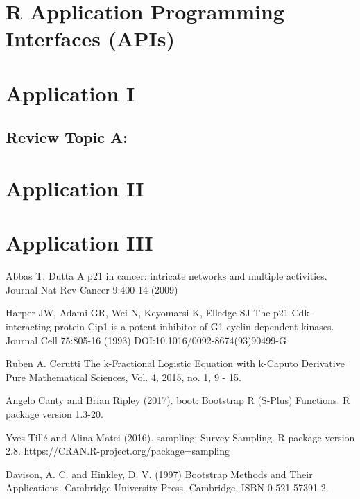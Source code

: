 \section{R Application Programming Interfaces (APIs)}




\begin{thebibliography}{00}

\section{Application I}

\subsection{Review Topic A:}

\section{Application II}

\section{Application III}

Abbas T, Dutta A
\newblock p21 in cancer: intricate networks and multiple activities.
\newblock Journal Nat Rev Cancer 9:400-14 (2009)

Harper JW, Adami GR, Wei N, Keyomarsi K, Elledge SJ
\newblock The p21 Cdk-interacting protein Cip1 is a potent inhibitor of G1 cyclin-dependent kinases.
\newblock Journal Cell 75:805-16 (1993) DOI:10.1016/0092-8674(93)90499-G

 Ruben A. Cerutti
\newblock The k-Fractional Logistic Equation with k-Caputo Derivative
\newblock Pure Mathematical Sciences, Vol.  4, 2015, no.  1, 9 - 15.

 Angelo Canty and Brian Ripley (2017). 
\newblock boot: Bootstrap R (S-Plus) Functions. 
\newblock R package version 1.3-20.

Yves Tillé and Alina Matei (2016). 
\newblock sampling: Survey Sampling. 
\newblock R package version 2.8. https://CRAN.R-project.org/package=sampling

 Davison, A. C. and Hinkley, D. V. (1997) 
\newblock Bootstrap Methods and Their Applications. 
\newblock Cambridge University Press, Cambridge. ISBN 0-521-57391-2.


\end{thebibliography}
